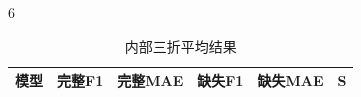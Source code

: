 \begin{PaperTable}{6}

\begin{table}[!htbp]
\centering\caption{内部三折平均结果\label{q2-tab4}}
\begin{tabular}{@{}llllll@{}}
\toprule
\begin{minipage}[b]{\dimexpr 0.350000\linewidth-3.500000\tabcolsep\relax}\raggedright
模型\strut
\end{minipage} & \begin{minipage}[b]{\dimexpr 0.130000\linewidth-1.300000\tabcolsep\relax}\raggedleft
完整F1\strut
\end{minipage} & \begin{minipage}[b]{\dimexpr 0.140000\linewidth-1.400000\tabcolsep\relax}\raggedleft
完整MAE\strut
\end{minipage} & \begin{minipage}[b]{\dimexpr 0.130000\linewidth-1.300000\tabcolsep\relax}\raggedleft
缺失F1\strut
\end{minipage} & \begin{minipage}[b]{\dimexpr 0.140000\linewidth-1.400000\tabcolsep\relax}\raggedleft
缺失MAE\strut
\end{minipage} & \begin{minipage}[b]{\dimexpr 0.110000\linewidth-1.100000\tabcolsep\relax}\raggedleft
S\strut
\end{minipage}\tabularnewline
\midrule


\end{tabular}
\end{table}
\end{PaperTable}
